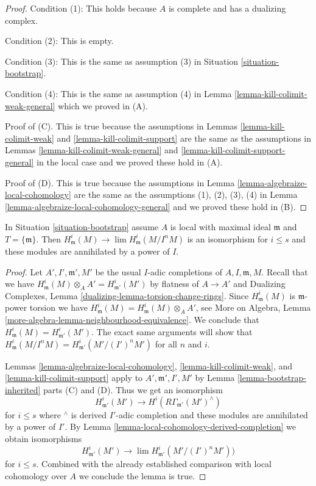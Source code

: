 \begin{proof}
\medskip\noindent
Condition (1): This holds because $A$ is complete and has a dualizing complex.

\medskip\noindent
Condition (2): This is empty.

\medskip\noindent
Condition (3): This is the same as assumption (3) in
Situation \ref{situation-bootstrap}.

\medskip\noindent
Condition (4): This is the same as assumption (4) in
Lemma \ref{lemma-kill-colimit-weak-general} which we proved in (A).

\medskip\noindent
Proof of (C). This is true because the assumptions in
Lemmas \ref{lemma-kill-colimit-weak} and \ref{lemma-kill-colimit-support}
are the same as the assumptions in
Lemmas \ref{lemma-kill-colimit-weak-general} and
\ref{lemma-kill-colimit-support-general} in the local case
and we proved these hold in (A).

\medskip\noindent
Proof of (D). This is true because the assumptions in
Lemma \ref{lemma-algebraize-local-cohomology}
are the same as the assumptions (1), (2), (3), (4) in
Lemma \ref{lemma-algebraize-local-cohomology-general}
and we proved these hold in (B).
\end{proof}

\begin{lemma}
\label{lemma-algebraize-local-cohomology-bis}
In Situation \ref{situation-bootstrap} assume $A$ is local with
maximal ideal $\mathfrak m$ and $T = \{\mathfrak m\}$. Then
$H^i_\mathfrak m(M) \to \lim H^i_\mathfrak m(M/I^nM)$
is an isomorphism for $i \leq s$ and these modules are
annihilated by a power of $I$.
\end{lemma}

\begin{proof}
Let $A', I', \mathfrak m', M'$ be the usual $I$-adic completions
of $A, I, \mathfrak m, M$. Recall that we have
$H^i_\mathfrak m(M) \otimes_A A' = H^i_{\mathfrak m'}(M')$
by flatness of $A \to A'$ and Dualizing Complexes, Lemma
\ref{dualizing-lemma-torsion-change-rings}.
Since $H^i_\mathfrak m(M)$ is $\mathfrak m$-power torsion we have
$H^i_\mathfrak m(M) = H^i_\mathfrak m(M) \otimes_A A'$, see
More on Algebra, Lemma \ref{more-algebra-lemma-neighbourhood-equivalence}.
We conclude that $H^i_\mathfrak m(M) = H^i_{\mathfrak m'}(M')$.
The exact same arguments will show that
$H^i_\mathfrak m(M/I^nM) =  H^i_{\mathfrak m'}(M'/(I')^nM')$
for all $n$ and $i$.

\medskip\noindent
Lemmas \ref{lemma-algebraize-local-cohomology},
\ref{lemma-kill-colimit-weak}, and
\ref{lemma-kill-colimit-support}
apply to $A', \mathfrak m', I', M'$ by
Lemma \ref{lemma-bootstrap-inherited} parts (C) and (D).
Thus we get an isomorphism
$$
H^i_{\mathfrak m'}(M') \longrightarrow H^i(R\Gamma_{\mathfrak m'}(M')^\wedge)
$$
for $i \leq s$ where ${}^\wedge$ is derived $I'$-adic completion and these
modules are annihilated by a power of $I'$.
By Lemma \ref{lemma-local-cohomology-derived-completion}
we obtain isomorphisms
$$
H^i_{\mathfrak m'}(M') \longrightarrow
\lim H^i_{\mathfrak m'}(M'/(I')^nM'))
$$
for $i \leq s$. Combined with the already established comparison
with local cohomology over $A$ we conclude the lemma is true.
\end{proof}

